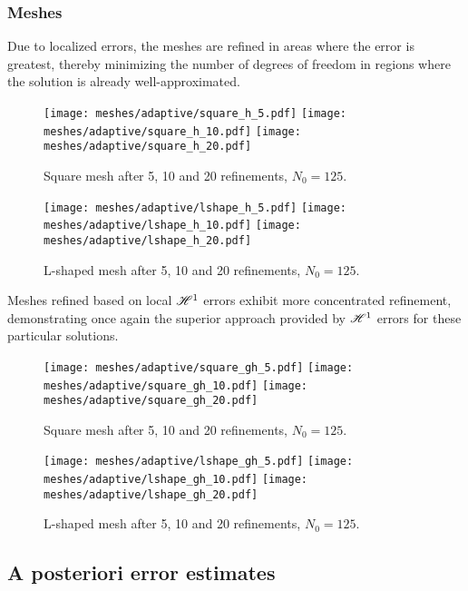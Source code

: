 \newpage
\subsubsection{Meshes}

Due to localized errors, the meshes are refined in areas where the error is greatest, thereby minimizing the number of degrees of freedom in regions where the solution is already well-approximated.

\begin{figure}[!ht]
	\centering
	\texttt{[image: meshes/adaptive/square\_h\_5.pdf]}
	\texttt{[image: meshes/adaptive/square\_h\_10.pdf]}
	\texttt{[image: meshes/adaptive/square\_h\_20.pdf]}
	\caption{Square mesh after 5, 10 and 20 refinements, $N_0 = 125$.}
\end{figure}

\begin{figure}[!ht]
	\centering
	\texttt{[image: meshes/adaptive/lshape\_h\_5.pdf]}
	\texttt{[image: meshes/adaptive/lshape\_h\_10.pdf]}
	\texttt{[image: meshes/adaptive/lshape\_h\_20.pdf]}
	\caption{L-shaped mesh after 5, 10 and 20 refinements, $N_0 = 125$.}
\end{figure}

\newpage

Meshes refined based on local $\mathscr{H}^1$ errors exhibit more concentrated refinement, demonstrating once again the superior approach provided by $\mathscr{H}^1$ errors for these particular solutions.

\begin{figure}[!ht]
	\centering
	\texttt{[image: meshes/adaptive/square\_gh\_5.pdf]}
	\texttt{[image: meshes/adaptive/square\_gh\_10.pdf]}
	\texttt{[image: meshes/adaptive/square\_gh\_20.pdf]}
	\caption{Square mesh after 5, 10 and 20 refinements, $N_0 = 125$.}
\end{figure}

\begin{figure}[!ht]
	\centering
	\texttt{[image: meshes/adaptive/lshape\_gh\_5.pdf]}
	\texttt{[image: meshes/adaptive/lshape\_gh\_10.pdf]}
	\texttt{[image: meshes/adaptive/lshape\_gh\_20.pdf]}
	\caption{L-shaped mesh after 5, 10 and 20 refinements, $N_0 = 125$.}
\end{figure}

\newpage
\subsection{A posteriori error estimates}

